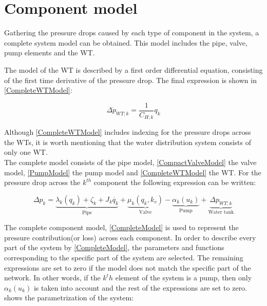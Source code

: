 \section{Component model} 
\label{CompleteSystemModel}

Gathering the pressure drops caused by each type of component in the system, a complete system model can be obtained. This model includes the pipe, valve, pump elements and the WT. 

The model of the WT is described by a first order differential equation, consisting of the first time derivative of the pressure drop. The final expression is shown in \eqref{CompleteWTModel}:

\begin{equation}
  \label{CompleteWTModel}
  \Delta \dot{p}_{WT;k} = \frac{1}{C_{H;k}} q_k 
\end{equation}

Although \eqref{CompleteWTModel} includes indexing for the pressure drops across the WTs, it is worth mentioning that the water distribution system consists of only one WT.
\\
The complete model consists of the pipe model, \eqref{CompactValveModel} the valve model, \eqref{PumpModel} the pump model and \eqref{CompleteWTModel} the WT. For the pressure drop across the $k^{th}$ component the following expression can be written: 

%

\begin{equation}
\label{CompleteModel}
\Delta p_k = \underbrace{\lambda_k (q_k) + \zeta_k + J_k \dot{q_k}}_\text{Pipe} + \underbrace{\mu_k (q_k, k_v)}_\text{Valve} - \underbrace{\alpha_k(u_k)}_\text{Pump} + \underbrace{\Delta p_{WT;k}}_\text{Water tank}
\end{equation}

The complete component model, \eqref{CompleteModel} is used to represent the pressure contribution(or loss) across each component. In order to describe every part of the system by \eqref{CompleteModel}, the parameters and functions corresponding to the specific part of the system are selected. The remaining expressions are set to zero if the model does not match the specific part of the network. In other words, if the $k^th$ element of the system is a pump, then only $\alpha_k(u_k)$ is taken into account and the rest of the expressions are set to zero. 
 shows the parametrization of the system: 

